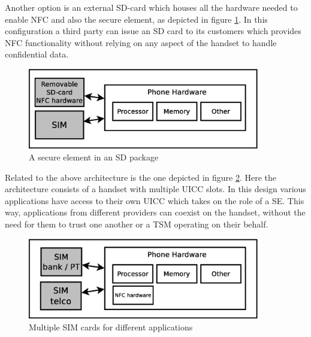 \begin{enumerate}
\begin{item}
Another option is an external SD-card which houses all the hardware needed to enable NFC and also the secure element, as depicted in figure \ref{fig:modular_se}.
In this configuration a third party can issue an SD card to its customers which provides NFC functionality without relying on any aspect of the handset to handle confidential data.
\begin{figure}
\includegraphics[width=0.9\textwidth]{images/SD_NFC}
\caption[SE in SD package]
{
A secure element in an SD package
}
\label{fig:modular_se}
\end{figure}
\end{item}

\begin{item}
Related to the above architecture is the one depicted in figure \ref{fig:multi_sim}.
Here the architecture consists of a handset with multiple UICC slots.
In this design various applications have access to their own UICC which takes on the role of a SE.
This way, applications from different providers can coexist on the handset, without the need for them to trust one another or a TSM operating on their behalf. %
\begin{figure}
\includegraphics[width=0.9\textwidth]{images/meerdere_sims}
\caption[Multiple SIM cards]
{
Multiple SIM cards for different applications
}
\label{fig:multi_sim}
\end{figure}
\end{item}


\end{enumerate}
